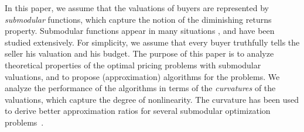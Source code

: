 \documentclass[letterpaper]{article}
\theoremstyle{definition}
\newcommand{\COMM}[2]{{
\begin{CJK}{UTF8}{ipxm}
\ifthenelse{\equal{#1}{TM}}{\color{blue}}{
\ifthenelse{\equal{#1}{YK}}{\color{red}}{
\ifthenelse{\equal{#1}{HS}}{\color{cyan}}{
\ifthenelse{\equal{#1}{KK}}{\color{magenta}}}}}
[#1: #2]
\end{CJK}
}}
\begin{document}


In this paper, we assume that the valuations of buyers are represented by \emph{submodular} functions, which capture the notion of the diminishing returns property.
Submodular functions appear in many situations \cite{bach2010structured,SomaY15}, and have been studied extensively.
For simplicity, %
we assume that every buyer truthfully tells the seller his valuation and his budget.
The purpose of this paper is to analyze theoretical properties of the optimal pricing problems with submodular valuations, and to propose (approximation) algorithms for the problems.
We analyze the performance of the algorithms in terms of the \emph{curvatures} of the valuations, which capture the degree of nonlinearity.
The curvature has been used to derive better approximation ratios for several submodular optimization problems~\cite{iyer2013submodular,iyer2013curvature,sviridenko2015optimal,vondrak2010submodularity}.
\end{document}
